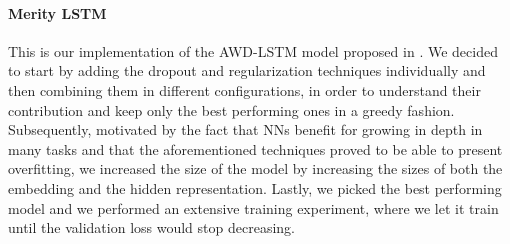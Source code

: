 \paragraph*{Merity LSTM}
This is our implementation of the AWD-LSTM model proposed in \cite{merity2017regularizing}. We decided to start by adding the dropout and regularization techniques individually and then combining them in different configurations, in order to understand their contribution and keep only the best performing ones in a greedy fashion. Subsequently, motivated by the fact that NNs benefit for growing in depth in many tasks and that the aforementioned techniques proved to be able to present overfitting, we increased the size of the model by increasing the sizes of both the embedding and the hidden representation. Lastly, we picked the best performing model and we performed an extensive training experiment, where we let it train until the validation loss would stop decreasing.